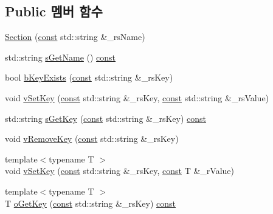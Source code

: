 \subsection*{Public 멤버 함수}
\begin{DoxyCompactItemize}
\item 
\mbox{\hyperlink{class_v_b_a_1_1_config_1_1_section_af1a15ac7cc46f2738a702b7dcbf62de2}{Section}} (\mbox{\hyperlink{getopt1_8c_a2c212835823e3c54a8ab6d95c652660e}{const}} std\+::string \&\+\_\+rs\+Name)
\item 
std\+::string \mbox{\hyperlink{class_v_b_a_1_1_config_1_1_section_a5d966e5bee05a441c62f775b79224baf}{s\+Get\+Name}} () \mbox{\hyperlink{getopt1_8c_a2c212835823e3c54a8ab6d95c652660e}{const}}
\item 
bool \mbox{\hyperlink{class_v_b_a_1_1_config_1_1_section_a2c189e6a7e47e3c13a4e3eb6aa7f477e}{b\+Key\+Exists}} (\mbox{\hyperlink{getopt1_8c_a2c212835823e3c54a8ab6d95c652660e}{const}} std\+::string \&\+\_\+rs\+Key)
\item 
void \mbox{\hyperlink{class_v_b_a_1_1_config_1_1_section_a57e1b95cbea40db71c093381beff4b0e}{v\+Set\+Key}} (\mbox{\hyperlink{getopt1_8c_a2c212835823e3c54a8ab6d95c652660e}{const}} std\+::string \&\+\_\+rs\+Key, \mbox{\hyperlink{getopt1_8c_a2c212835823e3c54a8ab6d95c652660e}{const}} std\+::string \&\+\_\+rs\+Value)
\item 
std\+::string \mbox{\hyperlink{class_v_b_a_1_1_config_1_1_section_a7ac9dfabf38bc1db83a6017e130f04ac}{s\+Get\+Key}} (\mbox{\hyperlink{getopt1_8c_a2c212835823e3c54a8ab6d95c652660e}{const}} std\+::string \&\+\_\+rs\+Key) \mbox{\hyperlink{getopt1_8c_a2c212835823e3c54a8ab6d95c652660e}{const}}
\item 
void \mbox{\hyperlink{class_v_b_a_1_1_config_1_1_section_a4634d3e637b664d40ba4d36f859e4573}{v\+Remove\+Key}} (\mbox{\hyperlink{getopt1_8c_a2c212835823e3c54a8ab6d95c652660e}{const}} std\+::string \&\+\_\+rs\+Key)
\item 
{\footnotesize template$<$typename T $>$ }\\void \mbox{\hyperlink{class_v_b_a_1_1_config_1_1_section_afd12017e2b18dd1e1be08dde721a37d0}{v\+Set\+Key}} (\mbox{\hyperlink{getopt1_8c_a2c212835823e3c54a8ab6d95c652660e}{const}} std\+::string \&\+\_\+rs\+Key, \mbox{\hyperlink{getopt1_8c_a2c212835823e3c54a8ab6d95c652660e}{const}} T \&\+\_\+r\+Value)
\item 
{\footnotesize template$<$typename T $>$ }\\T \mbox{\hyperlink{class_v_b_a_1_1_config_1_1_section_ab169d7aae4e9dde91418ba1668e3ad39}{o\+Get\+Key}} (\mbox{\hyperlink{getopt1_8c_a2c212835823e3c54a8ab6d95c652660e}{const}} std\+::string \&\+\_\+rs\+Key) \mbox{\hyperlink{getopt1_8c_a2c212835823e3c54a8ab6d95c652660e}{const}}

\end{DoxyCompactItemize}
